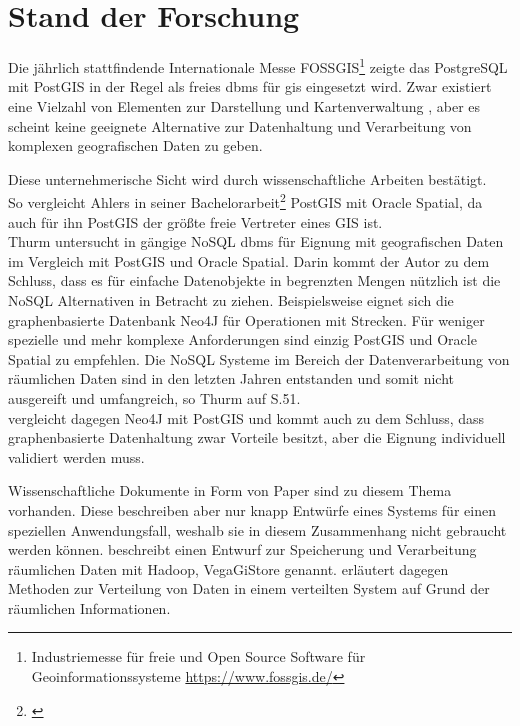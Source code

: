 

\section{Stand der Forschung}
Die jährlich stattfindende Internationale Messe FOSSGIS\footnote{Industriemesse für freie und Open Source Software für Geoinformationssysteme \url{https://www.fossgis.de/}} zeigte das PostgreSQL mit PostGIS in der Regel als freies \Gls{dbms} für \Gls{gis} eingesetzt wird.
Zwar existiert eine Vielzahl von Elementen zur Darstellung und Kartenverwaltung%
, aber es scheint keine geeignete Alternative zur Datenhaltung und Verarbeitung von komplexen geografischen Daten zu geben.

Diese unternehmerische Sicht wird durch wissenschaftliche Arbeiten bestätigt.\\
So vergleicht Ahlers in seiner Bachelorarbeit\footnote{\cite{ba:pgvsoracle}} PostGIS mit Oracle Spatial, da auch für ihn PostGIS der größte freie Vertreter eines GIS ist.\\
Thurm untersucht in \cite{ba:nosqlfuergeodaten} gängige NoSQL \Gls{dbms} für Eignung mit geografischen Daten im Vergleich mit PostGIS und Oracle Spatial.
Darin kommt der Autor zu dem Schluss, dass es für einfache Datenobjekte in begrenzten Mengen nützlich ist die NoSQL Alternativen in Betracht zu ziehen.
Beispielsweise eignet sich die graphenbasierte Datenbank Neo4J für Operationen mit Strecken.
Für weniger spezielle und mehr komplexe Anforderungen sind einzig PostGIS und Oracle Spatial zu empfehlen.
Die NoSQL Systeme im Bereich der Datenverarbeitung von räumlichen Daten sind in den letzten Jahren entstanden und somit nicht ausgereift und umfangreich, so Thurm auf S.51.\\
\cite{ma:neo4j} vergleicht dagegen Neo4J mit PostGIS und kommt auch zu dem Schluss, dass graphenbasierte Datenhaltung zwar Vorteile besitzt, aber die Eignung individuell validiert werden muss.

Wissenschaftliche Dokumente in Form von Paper sind zu diesem Thema vorhanden.
Diese beschreiben aber nur knapp Entwürfe eines Systems für einen speziellen Anwendungsfall, weshalb sie in diesem Zusammenhang nicht gebraucht werden können.
\cite{paper:hdfsspatial} beschreibt einen Entwurf zur Speicherung und Verarbeitung räumlichen Daten mit Hadoop, VegaGiStore genannt.
\cite{paper:spatialdistribution} erläutert dagegen Methoden zur Verteilung von Daten in einem verteilten System auf Grund der räumlichen Informationen.

